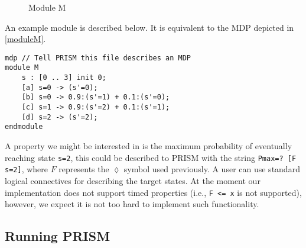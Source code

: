 \begin{figure}
\caption{Module M}
\label{moduleM}
\end{figure}

An example module is described below. It is equivalent to the MDP
depicted in \autoref{moduleM}.

\smallskip
\begin{verbatim}
mdp // Tell PRISM this file describes an MDP
module M
    s : [0 .. 3] init 0;
    [a] s=0 -> (s'=0);
    [b] s=0 -> 0.9:(s'=1) + 0.1:(s'=0);
    [c] s=1 -> 0.9:(s'=2) + 0.1:(s'=1);
    [d] s=2 -> (s'=2);
endmodule
\end{verbatim}
\smallskip


A property we might be interested in is the maximum probability of
eventually reaching state \verb|s=2|, this could be described to PRISM
with the string \verb|Pmax=? [F s=2]|, where $F$ represents the
$\lozenge$ symbol used previously. A user can use standard logical
connectives for describing the target states. At the moment our
implementation does not support timed properties (i.e., \verb|F <= x| is not
supported), however, we expect it is not too hard to implement such
functionality.

\subsection*{Running PRISM}

